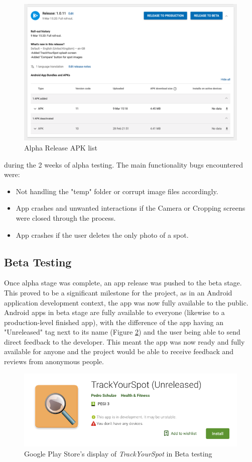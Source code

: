 \begin{figure}
    \includegraphics[width=1.2\textwidth, center]{figures/alpha_releases.png}
    \caption{Alpha Release APK list}
    \label{fig:alpha_releases.png}
\end{figure}
during the 2 weeks of alpha testing. The main functionality bugs encountered were:
\begin{itemize}
    \item Not handling the "temp" folder or corrupt image files accordingly.
    \item App crashes and unwanted interactions if the Camera or Cropping screens were closed through the process.
    \item App crashes if the user deletes the only photo of a spot. 
\end{itemize}

\subsection{Beta Testing}
Once alpha stage was complete, an app release was pushed to the beta stage. This proved to be a significant milestone for the project, as in an Android application development context, the app was now fully available to the public. Android apps in beta stage are fully available to everyone (likewise to a production-level finished app), with the difference of the app having an "Unreleased" tag next to its name (Figure \ref{fig:betarelease}) and the user being able to send direct feedback to the developer. This meant the app was now ready and fully available for anyone and the project would be able to receive feedback and reviews from anonymous people. 

\begin{figure}[H]
    \includegraphics[width=1.2\textwidth, center]{figures/betarelease.png}
    \caption{Google Play Store's display of \emph{TrackYourSpot} in Beta testing}
    \label{fig:betarelease}
\end{figure}

